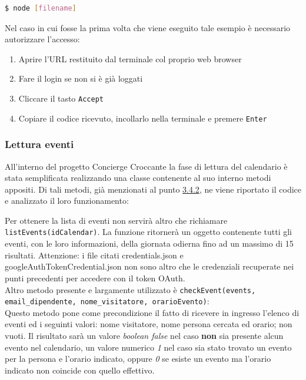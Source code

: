 \begin{itemize}
	\begin{lstlisting}[language=bash]
		$ node [filename]
	\end{lstlisting}
	Nel caso in cui fosse la prima volta che viene eseguito tale esempio è necessario autorizzare l'accesso:
	\begin{enumerate}
		\item Aprire l'URL restituito dal terminale col proprio web browser
		\item Fare il login se non si è già loggati
		\item Cliccare il tasto \texttt{Accept}
		\item Copiare il codice ricevuto, incollarlo nella terminale e premere \texttt{Enter}
	\end{enumerate}
\end{itemize}
\subsubsection{Lettura eventi}
All'interno del progetto Concierge Croccante la fase di lettura del calendario è stata semplificata realizzando una classe contenente al suo interno metodi appositi. Di tali metodi, già menzionati al punto \hyperref[utils]{3.4.2}, ne viene riportato il codice e analizzato il loro funzionamento:

Per ottenere la lista di eventi non servirà altro che richiamare \texttt{listEvents(idCalendar)}. La funzione ritornerà un oggetto contenente tutti gli eventi, con le loro informazioni, della giornata odierna fino ad un massimo di 15 risultati. Attenzione: i file citati credentials.json e googleAuthTokenCredential.json non sono altro che le credenziali recuperate nei punti precedenti per accedere con il token OAuth.
\\[0.5cm]
Altro metodo presente e largamente utilizzato è \texttt{checkEvent(events, email\_dipendente, nome\_visitatore, orarioEvento)}:
\\[0.1cm]

Questo metodo pone come precondizione il fatto di ricevere in ingresso l'elenco di eventi ed i seguinti valori: nome visitatore, nome persona cercata ed orario; non vuoti. Il risultato sarà un valore \textit{boolean false} nel caso \textbf{non} sia presente alcun evento nel calendario, un valore numerico \textit{1} nel caso sia stato trovato un evento per la persona e l'orario indicato, oppure \textit{0} se esiste un evento ma l'orario indicato non coincide con quello effettivo.


